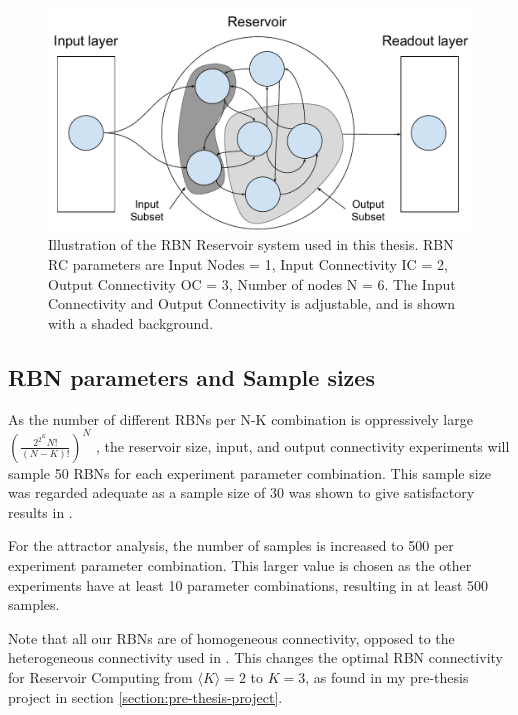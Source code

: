 \begin{figure}
    \centering
    \caption[Illustration of the RBN reservoir computing system used in this thesis]{
        Illustration of the RBN Reservoir system used in this thesis.
        RBN RC parameters are Input Nodes = 1, Input Connectivity IC = 2, Output Connectivity OC = 3, Number of nodes N = 6.
        The Input Connectivity and Output Connectivity is adjustable,
        and is shown with a shaded background.
    }
    \label{figure:rbn-reservoir-subsets}
    \includegraphics[width=\columnwidth]{method/rbn_reservoir_subsets.pdf}
\end{figure}

\subsection{RBN parameters and Sample sizes}

As the number of different RBNs per N-K combination is oppressively large
$(\frac{2^{2^{K}}N!}{(N-K)!})^N$ \cite{gershenson2004introduction},
the reservoir size, input, and output connectivity experiments will sample 50 RBNs for each experiment parameter combination.
This sample size was regarded adequate as a sample size of 30 was shown to give satisfactory results in \cite{burkow2015evolving}.

For the attractor analysis, the number of samples is increased to 500 per experiment parameter combination.
This larger value is chosen as the other experiments have at least 10 parameter combinations,
resulting in at least 500 samples.

Note that all our RBNs are of homogeneous connectivity,
opposed to the heterogeneous connectivity used in \cite{rbn-reservoir}.
This changes the optimal RBN connectivity for Reservoir Computing from $ \langle K \rangle = 2 $ to $ K = 3$,
as found in my pre-thesis project in section \ref{section:pre-thesis-project}.

